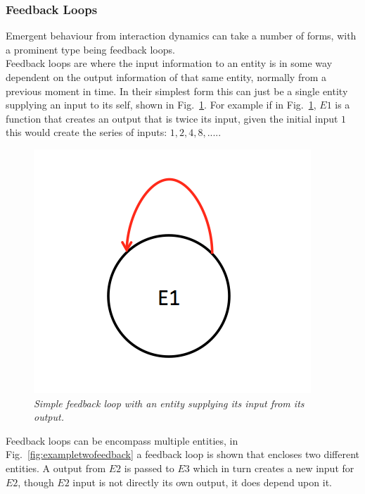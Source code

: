 \documentclass{article}
\begin{document}
\subsubsection{Feedback Loops}
Emergent behaviour from interaction dynamics can take a number of forms, with a prominent type being feedback loops.\\
Feedback loops are where the input information to an entity is in some way dependent on the output information of that same entity, normally from a previous moment in time. In their simplest form this can just be a single entity supplying an input to its self, shown in Fig.~\ref{fig:exampleselffeedback}. For example if in Fig.~\ref{fig:exampleselffeedback}, $E1$ is a function that creates an output that is twice its input, given the initial input $1$ this would create the series of inputs: $1,2,4,8,....$.
\begin{figure}[H]
	\centering
	\includegraphics[scale=0.5]{selffeedback}
	\caption{\it Simple feedback loop with an entity supplying its input from its output.}
	\label{fig:exampleselffeedback}
\end{figure} 
Feedback loops can be encompass multiple entities, in Fig.~\ref{fig:exampletwofeedback} a feedback loop is shown that encloses two different entities. A output from $E2$ is passed to $E3$ which in turn creates a new input for $E2$, though $E2$ input is not directly its own output, it does depend upon it. 
\end{document}
